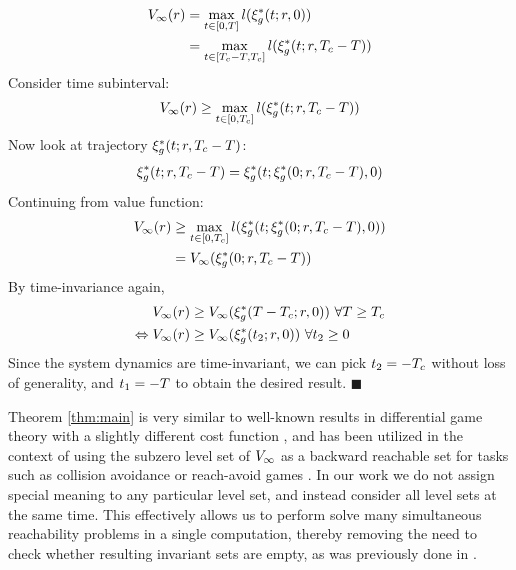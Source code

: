  \begin{equation}
 \begin{aligned}
 V_\infty(r) &= \max_{t \in [0, T]} l(\xi_g^*(t; r, 0)) \\
 &= \max_{t \in [T_c-T, T_c]} l(\xi_g^*(t; r, T_c-T)) \\
 \end{aligned}
 \end{equation}  
Consider time subinterval:
 \begin{equation}
\begin{aligned}
V_\infty(r) \ge \max_{t \in [0, T_c]} l(\xi_g^*(t; r, T_c-T)) \\
\end{aligned}
\end{equation}  
Now look at trajectory $\xi_g^*(t; r, T_c-T)$:
\begin{equation}
\begin{aligned}
\xi_g^*(t; r, T_c-T) = \xi_g^*(t; \xi_g^*(0; r, T_c-T), 0)
\end{aligned}
\end{equation}
Continuing from value function:
\begin{equation}
\begin{aligned}
V_\infty(r) &\ge \max_{t \in [0, T_c]} l(\xi_g^*(t; \xi_g^*(0; r, T_c-T), 0)) \\
&= V_\infty(\xi_g^*(0; r, T_c-T))
\end{aligned}
\end{equation} 
 By time-invariance again,
 \begin{equation}
 \begin{aligned}
 V_\infty(r) &\ge V_\infty(\xi_g^*(T-T_c; r, 0)) ~ \forall T\ge T_c \\
 \Leftrightarrow  V_\infty(r) &\ge V_\infty(\xi_g^*(t_2; r, 0)) ~ \forall t_2 \ge 0
 \end{aligned}
 \end{equation} 
   Since the system dynamics are time-invariant, we can pick $t_2 = -T_c$ without loss of generality, and $t_1 = -T$ to obtain the desired result. \hfill $\blacksquare$
 

 
 
 \begin{rem} 
   Theorem \ref{thm:main} is very similar to well-known results in differential game theory with a slightly different cost function \cite{}, and has been utilized in the context of using the subzero level set of $V_\infty$ as a backward reachable set for tasks such as collision avoidance or reach-avoid games \cite{}. In our work we do not assign special meaning to any particular level set, and instead consider all level sets at the same time. This effectively allows us to perform solve many simultaneous reachability problems in a single computation, thereby removing the need to check whether resulting invariant sets are empty, as was previously done in .
 \end{rem}
